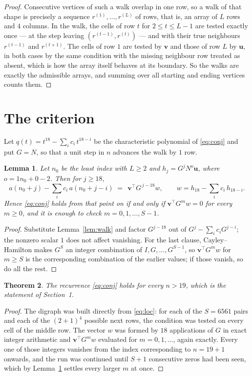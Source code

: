 \documentclass[11pt,a4paper]{article}
\theoremstyle{plain}
\newtheorem{theorem}{Theorem}
\newtheorem{lemma}[theorem]{Lemma}
\theoremstyle{definition}
\begin{document}
\begin{proof}
Consecutive vertices of such a walk overlap in one row, so a walk of that shape is
precisely a sequence $r^{(1)},\dots,r^{(L)}$ of rows, that is, an array of $L$ rows
and $4$ columns. In the walk, the cells of row $t$ for $2\le t\le L-1$ are tested
exactly once --- at the step leaving $(r^{(t-1)},r^{(t)})$ --- and with their true
neighbours $r^{(t-1)}$ and $r^{(t+1)}$. The cells of row $1$ are tested by
$\mathbf{v}$ and those of row $L$ by $\mathbf{u}$, in both cases by the same condition
with the missing neighbour row treated as absent, which is how the array itself behaves at
its boundary. So the walks are exactly the admissible arrays, and summing over all starting
and ending vertices counts them.
\end{proof}

\section{The criterion}

Let $q(t)=t^{18}-\sum_i c_i\,t^{18-i}$ be the characteristic polynomial of
\eqref{eq:conj} and put $G=N$, so that a unit step in $n$ advances the walk by
$1$ row.

\begin{lemma}\label{lem:crit}
Let $n_0$ be the least index with $L\ge2$ and $h_j=G^{j}N^{o}\mathbf{u}$, where
$o=1n_0+0-2$. Then for $j\ge18$,
\[
a(n_0+j)-\sum_i c_i\,a(n_0+j-i)\;=\;\,\mathbf{v}^{\!\top}G^{\,j-18}w,
\qquad w=h_{18}-\sum_i c_i\,h_{18-i} .
\]
Hence \eqref{eq:conj} holds from that point on if and only if
$\mathbf{v}^{\!\top}G^{m}w=0$ for every $m\ge0$, and it is enough to check
$m=0,1,\dots,S-1$.
\end{lemma}

\begin{proof}
Substitute Lemma~\ref{lem:walk} and factor $G^{j-18}$ out of
$G^{j}-\sum_ic_iG^{j-i}$; the nonzero scalar $1$ does not affect
vanishing. For the last clause, Cayley--Hamilton makes $G^{S}$ an integer combination of
$I,G,\dots,G^{S-1}$, so $\mathbf{v}^{\!\top}G^{m}w$ for $m\ge S$ is the corresponding
combination of the earlier values; if those vanish, so do all the rest.
\end{proof}

\begin{theorem}
The recurrence \eqref{eq:conj} holds for every $n>19$, which is the statement of
Section~1.
\end{theorem}

\begin{proof}
The digraph was built directly from \eqref{eq:loc}: for each of the $S=6561$ pairs and each
of the $(2+1)^{4}$ possible next rows, the condition was tested on every cell of
the middle row. The vector $w$ was formed by $18$ applications of $G$ in exact integer
arithmetic and $\mathbf{v}^{\!\top}G^{m}w$ evaluated for $m=0,1,\dots$, again exactly.
Every one of those integers vanishes from the index corresponding to $n=19+1$ onwards,
and the run was continued until $S+1$ consecutive zeros had been seen, which by
Lemma~\ref{lem:crit} settles every larger $m$ at once.
\end{proof}
\end{document}
